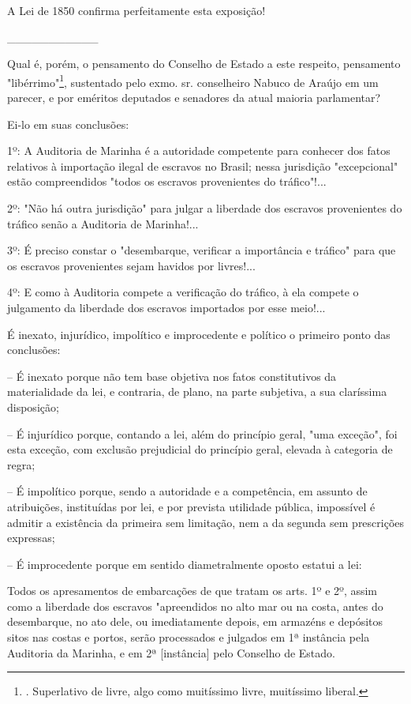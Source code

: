 A Lei de 1850 confirma perfeitamente esta exposição!

\_\_\_\_\_\_\_\_\_\_\_

Qual é, porém, o pensamento do Conselho de Estado a este respeito,
pensamento "libérrimo"\footnote{. Superlativo de livre, algo como
  muitíssimo livre, muitíssimo liberal.}, sustentado pelo exmo. sr.
conselheiro Nabuco de Araújo em um parecer, e por eméritos deputados e
senadores da atual maioria parlamentar?

Ei-lo em suas conclusões:

1º: A Auditoria de Marinha é a autoridade competente para conhecer dos
fatos relativos à importação ilegal de escravos no Brasil; nessa
jurisdição "excepcional" estão compreendidos "todos os escravos
provenientes do tráfico"!...

2º: "Não há outra jurisdição" para julgar a liberdade dos escravos
provenientes do tráfico senão a Auditoria de Marinha!...

3º: É preciso constar o "desembarque, verificar a importância e tráfico"
para que os escravos provenientes sejam havidos por livres!...

4º: E como à Auditoria compete a verificação do tráfico, à ela compete o
julgamento da liberdade dos escravos importados por esse meio!...

É inexato, injurídico, impolítico e improcedente e político o primeiro
ponto das conclusões:

-- É inexato porque não tem base objetiva nos fatos constitutivos da
materialidade da lei, e contraria, de plano, na parte subjetiva, a sua
claríssima disposição;

-- É injurídico porque, contando a lei, além do princípio geral, "uma
exceção", foi esta exceção, com exclusão prejudicial do princípio geral,
elevada à categoria de regra;

-- É impolítico porque, sendo a autoridade e a competência, em assunto
de atribuições, instituídas por lei, e por prevista utilidade pública,
impossível é admitir a existência da primeira sem limitação, nem a da
segunda sem prescrições expressas;

-- É improcedente porque em sentido diametralmente oposto estatui a lei:

Todos os apresamentos de embarcações de que tratam os arts. 1º e 2º,
assim como a liberdade dos escravos "apreendidos no alto mar ou na
costa, antes do desembarque, no ato dele, ou imediatamente depois, em
armazéns e depósitos sitos nas costas e portos, serão processados e
julgados em 1ª instância pela Auditoria da Marinha, e em 2ª
{[}instância{]} pelo Conselho de Estado.

